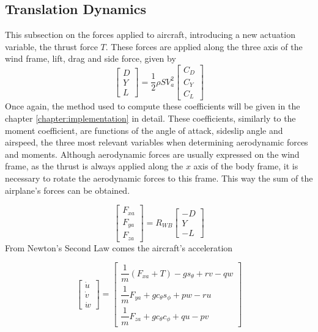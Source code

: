 \subsection{Translation Dynamics}
\label{section:background/model/guidance_dynamics}

This subsection on the forces applied to aircraft, introducing a new actuation variable, the thrust force $T$. These forces are applied along the three axis of the wind frame, lift, drag and side force, given by
\begin{equation}
\begin{bmatrix}
D\\
Y\\
L
\end{bmatrix}
= \dfrac{1}{2} \rho SV_a^2
\begin{bmatrix}
C_D\\
C_Y\\
C_L
\end{bmatrix}
\label{eq:forces}
\end{equation}
Once again, the method used to compute these coefficients will be given in the chapter \ref{chapter:implementation} in detail. These coefficients, similarly to the moment coefficient, are functions of the angle of attack, sideslip angle and airspeed, the three most relevant variables when determining aerodynamic forces and moments. Although aerodynamic forces are usually expressed on the wind frame, as the thrust is always applied along the $x$ axis of the body frame, it is necessary to rotate the aerodynamic forces to this frame. This way the sum of the airplane's forces can be obtained. 

\begin{equation}
\begin{bmatrix}
F_{xa}\\
F_{ya}\\
F_{za}
\end{bmatrix}
= R_{WB}
\begin{bmatrix}
-D\\
Y\\
-L
\end{bmatrix}
\label{eq:body_forces}
\end{equation}
From Newton's Second Law comes the aircraft's acceleration

\begin{equation}
\begin{bmatrix}
\dot{u}\\
\dot{v}\\
\dot{w}
\end{bmatrix}
=
\begin{bmatrix}
\dfrac{1}{m}(F_{xa} + T) - gs_\theta +rv-qw\\
\dfrac{1}{m}F_{ya} + gc_\theta s_\phi + pw - ru\\
\dfrac{1}{m}F_{za} + gc_\theta c_\phi + qu - pv
\end{bmatrix}
\label{eq:boddy_acc}
\end{equation}

